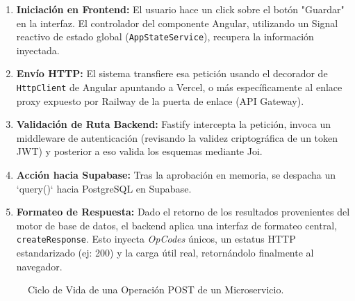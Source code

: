 \documentclass[12pt,a4paper]{report}
\begin{document}
\begin{enumerate}
    \item \textbf{Iniciación en Frontend:} El usuario hace un click sobre el botón "Guardar" en la interfaz. El controlador del componente Angular, utilizando un Signal reactivo de estado global (\texttt{AppStateService}), recupera la información inyectada.
    \item \textbf{Envío HTTP:} El sistema transfiere esa petición usando el decorador de \texttt{HttpClient} de Angular apuntando a Vercel, o más específicamente al enlace proxy expuesto por Railway de la puerta de enlace (API Gateway).
    \item \textbf{Validación de Ruta Backend:} Fastify intercepta la petición, invoca un middleware de autenticación (revisando la validez criptográfica de un token JWT) y posterior a eso valida los esquemas mediante Joi.
    \item \textbf{Acción hacia Supabase:} Tras la aprobación en memoria, se despacha un `query()` hacia PostgreSQL en Supabase.
    \item \textbf{Formateo de Respuesta:} Dado el retorno de los resultados provenientes del motor de base de datos, el backend aplica una interfaz de formateo central, \texttt{createResponse}. Esto inyecta \textit{OpCodes} únicos, un estatus HTTP estandarizado (ej: 200) y la carga útil real, retornándolo finalmente al navegador.
\end{enumerate}

\begin{figure}[H]
    \centering
    \caption{Ciclo de Vida de una Operación POST de un Microservicio.}
\end{figure}
\end{document}
